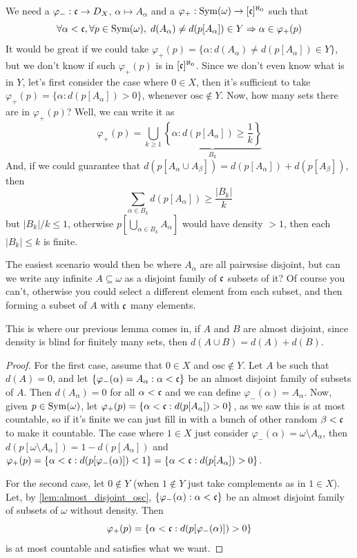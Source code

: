 \begin{sketch}
    We need a $\varphi_-:\mathfrak{c}\to D_X$, $\alpha\mapsto A_\alpha$ and a $\varphi_+:\mathrm{Sym}(\omega)\to[\mathfrak{c}]^{\aleph_0}$ such that
    $$\forall\alpha<\mathfrak{c},\forall p\in\mathrm{Sym}(\omega),\;d(A_\alpha)\neq d(p[A_\alpha])\in Y\Rightarrow\alpha\in\varphi_+(p)$$
    It would be great if we could take $\varphi_+(p)=\{\alpha:d(A_\alpha)\neq d(p[A_\alpha])\in Y\}$, but we don't know if such $\varphi_+(p)$ is in $[\mathfrak{c}]^{\aleph_0}$. Since we don't even know what is in $Y$, let's first consider the case where $0\in X$, then it's sufficient to take $\varphi_+(p)=\{\alpha:d(p[A_\alpha])>0\}$, whenever $\text{osc}\notin Y$. Now, how many sets there are in $\varphi_+(p)$? Well, we can write it as
    $$\varphi_+(p)=\bigcup_{k\geq 1}\underbrace{\left\{\alpha:d(p[A_\alpha])\geq\frac1k\right\}}_{B_k}$$
    And, if we could guarantee that $d(p[A_\alpha\cup A_\beta])=d(p[A_\alpha])+d(p[A_\beta])$, then
    $$\sum_{\alpha\in B_k}d(p[A_\alpha])\geq\frac{\lvert B_k\rvert}{k}$$
    but $\lvert B_k\rvert/k\leq1$, otherwise $p[\bigcup_{\alpha\in B_k}A_\alpha]$ would have density $>1$, then each $\lvert B_k\rvert\leq k$ is finite.

    The easiest scenario would then be where $A_\alpha$ are all pairwsise disjoint, but can we write any infinite $A\subseteq\omega$ as a disjoint family of $\mathfrak{c}$ subsets of it? Of course you can't, otherwise you could select a different element from each subset, and then forming a subset of $A$ with $\mathfrak{c}$ many elements.

    This is where our previous lemma comes in, if $A$ and $B$ are almost disjoint, since density is blind for finitely many sets, then $d(A\cup B)=d(A)+d(B)$.
\end{sketch}

\begin{proof}
    For the first case, assume that $0\in X$ and $\text{osc}\notin Y$. Let $A$ be such that $d(A)=0$, and let $\{\varphi_-(\alpha)=A_\alpha:\alpha<\mathfrak{c}\}$ be an almost disjoint family of subsets of $A$. Then $d(A_\alpha)=0$ for all $\alpha<\mathfrak{c}$ and we can define $\varphi_-(\alpha)=A_\alpha$. Now, given $p\in\mathrm{Sym}(\omega)$, let $\varphi_+(p)=\{\alpha<\mathfrak{c}:d(p[A_\alpha])>0\}$, as we saw this is at most countable, so if it's finite we can just fill in with a bunch of other random $\beta<\mathfrak{c}$ to make it countable. The case where $1\in X$ just consider $\varphi_-(\alpha)=\omega\setminus A_\alpha$, then $d(p[\omega\setminus A_\alpha])=1-d(p[A_\alpha])$ and $\varphi_+(p)=\{\alpha<\mathfrak{c}:d(p[\varphi_-(\alpha)])<1\}=\{\alpha<\mathfrak{c}:d(p[A_\alpha])>0\}$.

    For the second case, let $0\notin Y$ (when $1\notin Y$ just take complements as in $1\in X$). Let, by \cref{lem:almost_disjoint_osc}, $\{\varphi_-(\alpha):\alpha<\mathfrak{c}\}$ be an almost disjoint family of subsets of $\omega$ without density. Then
    $$\varphi_+(p)=\{\alpha<\mathfrak{c}:d(p[\varphi_-(\alpha)])>0\}$$
    is at most countable and satisfies what we want.
\end{proof}

